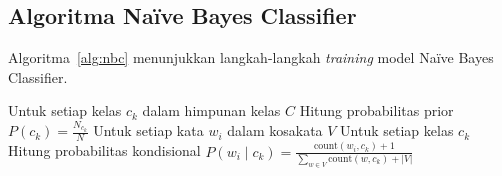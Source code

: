 \subsection{Algoritma Na\"ive Bayes Classifier}

Algoritma~\ref{alg:nbc} menunjukkan langkah-langkah \emph{training} model Na\"ive Bayes Classifier.

\begin{algorithm}[H]
\caption{\emph{Training} Na\"ive Bayes Classifier}
\label{alg:nbc}
Untuk setiap kelas $c_k$ dalam himpunan kelas $C$\;
  Hitung probabilitas prior $P(c_k) = \frac{N_{c_k}}{N}$\;
Untuk setiap kata $w_i$ dalam kosakata $V$\;
  Untuk setiap kelas $c_k$\;
    Hitung probabilitas kondisional $P(w_i \mid c_k) = \frac{\text{count}(w_i, c_k) + 1}{\sum_{w \in V} \text{count}(w, c_k) + |V|}$\;
\end{algorithm}
